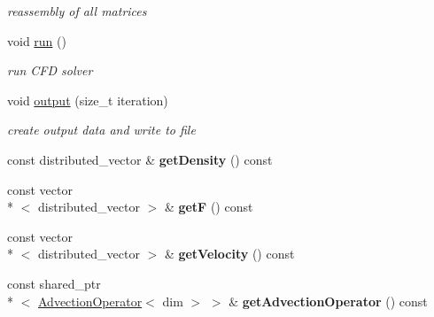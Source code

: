 \begin{DoxyCompactItemize}
\begin{DoxyCompactList}\small\item\em reassembly of all matrices \end{DoxyCompactList}\item 
\hypertarget{classnatrium_1_1CFDSolver_a11f503bc3f3c306b240874c74a38025b}{void \hyperlink{classnatrium_1_1CFDSolver_a11f503bc3f3c306b240874c74a38025b}{run} ()}\label{classnatrium_1_1CFDSolver_a11f503bc3f3c306b240874c74a38025b}

\begin{DoxyCompactList}\small\item\em run C\-F\-D solver \end{DoxyCompactList}\item 
\hypertarget{classnatrium_1_1CFDSolver_abf6804f132885502b61877fc1f9ca4a2}{void \hyperlink{classnatrium_1_1CFDSolver_abf6804f132885502b61877fc1f9ca4a2}{output} (size\-\_\-t iteration)}\label{classnatrium_1_1CFDSolver_abf6804f132885502b61877fc1f9ca4a2}

\begin{DoxyCompactList}\small\item\em create output data and write to file \end{DoxyCompactList}\item 
\hypertarget{classnatrium_1_1CFDSolver_adf0b4e4da292bcb195d926d3174ba2a9}{const distributed\-\_\-vector \& {\bfseries get\-Density} () const }\label{classnatrium_1_1CFDSolver_adf0b4e4da292bcb195d926d3174ba2a9}

\item 
\hypertarget{classnatrium_1_1CFDSolver_aa7a6591ab785a87d60bcc12da9daf8ff}{const vector\\*
$<$ distributed\-\_\-vector $>$ \& {\bfseries get\-F} () const }\label{classnatrium_1_1CFDSolver_aa7a6591ab785a87d60bcc12da9daf8ff}

\item 
\hypertarget{classnatrium_1_1CFDSolver_a0e5ec3dc278216d5827410b7db82af59}{const vector\\*
$<$ distributed\-\_\-vector $>$ \& {\bfseries get\-Velocity} () const }\label{classnatrium_1_1CFDSolver_a0e5ec3dc278216d5827410b7db82af59}

\item 
\hypertarget{classnatrium_1_1CFDSolver_a1aea207c81089c2e46092489557bb139}{const shared\-\_\-ptr\\*
$<$ \hyperlink{classnatrium_1_1AdvectionOperator}{Advection\-Operator}$<$ dim $>$ $>$ \& {\bfseries get\-Advection\-Operator} () const }\label{classnatrium_1_1CFDSolver_a1aea207c81089c2e46092489557bb139}


\end{DoxyCompactItemize}
